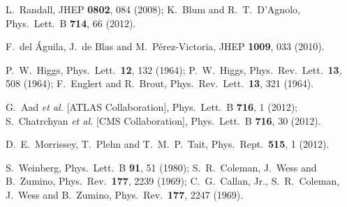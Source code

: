   L.~Randall,
  JHEP {\bf 0802}, 084 (2008);
  K.~Blum and R.~T.~D'Agnolo,
  Phys.\ Lett.\ B {\bf 714}, 66 (2012).
  
  F.~del \'Aguila, J.~de Blas and M.~P\'erez-Victoria,
  JHEP {\bf 1009}, 033 (2010).





  P.~W.~Higgs,
  Phys.\ Lett.\  {\bf 12}, 132 (1964);
  P.~W.~Higgs,
  Phys.\ Rev.\ Lett.\  {\bf 13}, 508 (1964);
  F.~Englert and R.~Brout,
  Phys.\ Rev.\ Lett.\  {\bf 13}, 321 (1964).
  
  G.~Aad {\it et al.} [ATLAS Collaboration],
  Phys.\ Lett.\ B {\bf 716}, 1 (2012);
  S.~Chatrchyan {\it et al.}  [CMS Collaboration],
  Phys.\ Lett.\ B {\bf 716}, 30 (2012).

  D.~E.~Morrissey, T.~Plehn and T.~M.~P.~Tait,
  Phys.\ Rept.\  {\bf 515}, 1 (2012).

  S.~Weinberg,
  Phys.\ Lett.\ B {\bf 91}, 51 (1980);
  S.~R.~Coleman, J.~Wess and B.~Zumino,
  Phys.\ Rev.\  {\bf 177}, 2239 (1969);
  C.~G.~Callan, Jr., S.~R.~Coleman, J.~Wess and B.~Zumino,
  Phys.\ Rev.\  {\bf 177}, 2247 (1969).

